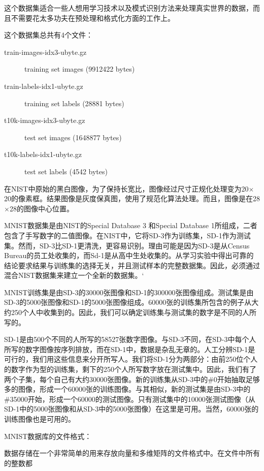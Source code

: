 这个数据集适合一些人想用学习技术以及模式识别方法来处理真实世界的数据，而且不需要花太多功夫在预处理和格式化方面的工作上。

这个数据集总共有4个文件：
\begin{description}
\item[{\footnotesize{train-images-idx3-ubyte.gz}}] {\footnotesize{training set images (9912422 bytes)}} 
\item[{\footnotesize{train-labels-idx1-ubyte.gz}}] {\footnotesize{training set labels (28881 bytes)}} 
\item[{\footnotesize{t10k-images-idx3-ubyte.gz}}] {\footnotesize{test set images (1648877 bytes)}} 
\item[{\footnotesize{t10k-labels-idx1-ubyte.gz}}] {\footnotesize{test set labels (4542 bytes)}}
\end{description}

在NIST中原始的黑白图像，为了保持长宽比，图像经过尺寸正规化处理变为20$\times$20的像素框。结果图像是灰度保真图，使用了规范化算法处理。而且，图像是在28$\times$28的图像中心位置。

MNIST数据集是由NIST的Special Database 3 和Special Database 1所组成，二者包含了手写数字的二值图像。在NIST中，它将SD-3作为训练集，SD-1作为测试集。然而，SD-3比SD-1更清洗，更容易识别。理由可能是因为SD-3是从Census Bureau的员工处收集的，而Sd-1是从高中生处收集的。从学习实验中得出可靠的结论要求结果与训练集的选择无关，并且测试样本的完整数据集。因此，必须通过混合NIST数据集来建立一个全新的数据集。‘

MNIST训练集是由SD-3的30000张图像和SD-1的300000张图像组成。测试集是由SD-3的5000张图像和SD-1的5000张图像组成。60000张的训练集所包含的例子从大约250个人中收集到的。因此，我们可以确定训练集与测试集的数字是不同的人所写的。

SD-1是由500个不同的人所写的58527张数字图像。与SD-3不同，在SD-3中每个人所写的数字图像按序列排放，而在SD-1中，数据是杂乱无章的。人工分辨SD-1是可行的，我们用这些信息来分开所写人。我们将SD-1分为两部分：由前250位个人的数字作为型的训练集，剩下的250个人所写数字放在测试集中。因此，我们有了两个子集，每个自己有大约30000张图像。新的训练集从SD-3中的\#0开始抽取足够多的图像，形成一个60000张的训练图像。与其相似，新的测试集是由SD-3中的\#35000开始，形成一个60000的测试图像。只有测试集中的10000张测试图像（从SD-1中的5000张图像和从SD-3中的5000张图像）在这里是可用。当然，60000张的训练图像也是可用的。

MNIST数据库的文件格式：

数据存储在一个非常简单的用来存放向量和多维矩阵的文件格式中。在文件中所有的整数都

